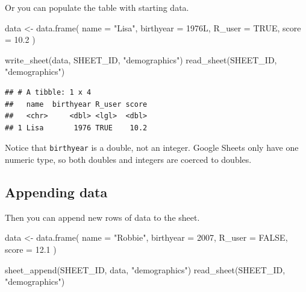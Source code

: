 \documentclass[
  oneside]{book}
\newenvironment{Shaded}{\begin{snugshade}}{\end{snugshade}}
\newcommand{\AttributeTok}[1]{\textcolor[rgb]{0.77,0.63,0.00}{#1}}
\newcommand{\ConstantTok}[1]{\textcolor[rgb]{0.00,0.00,0.00}{#1}}
\newcommand{\DecValTok}[1]{\textcolor[rgb]{0.00,0.00,0.81}{#1}}
\newcommand{\FloatTok}[1]{\textcolor[rgb]{0.00,0.00,0.81}{#1}}
\newcommand{\FunctionTok}[1]{\textcolor[rgb]{0.00,0.00,0.00}{#1}}
\newcommand{\NormalTok}[1]{#1}
\newcommand{\OtherTok}[1]{\textcolor[rgb]{0.56,0.35,0.01}{#1}}
\newcommand{\StringTok}[1]{\textcolor[rgb]{0.31,0.60,0.02}{#1}}
\begin{document}
Or you can populate the table with starting data.

\begin{Shaded}
\begin{Highlighting}[]
\NormalTok{data }\OtherTok{\textless{}{-}} \FunctionTok{data.frame}\NormalTok{(}
  \AttributeTok{name =} \StringTok{"Lisa"}\NormalTok{,}
  \AttributeTok{birthyear =}\NormalTok{ 1976L,}
  \AttributeTok{R\_user =} \ConstantTok{TRUE}\NormalTok{,}
  \AttributeTok{score =} \FloatTok{10.2}
\NormalTok{)}

\FunctionTok{write\_sheet}\NormalTok{(data, SHEET\_ID, }\StringTok{"demographics"}\NormalTok{)}
\FunctionTok{read\_sheet}\NormalTok{(SHEET\_ID, }\StringTok{"demographics"}\NormalTok{)}
\end{Highlighting}
\end{Shaded}

\begin{verbatim}
## # A tibble: 1 x 4
##   name  birthyear R_user score
##   <chr>     <dbl> <lgl>  <dbl>
## 1 Lisa       1976 TRUE    10.2
\end{verbatim}

\begin{info}
Notice that \texttt{birthyear} is a double, not an integer. Google Sheets only have one numeric type, so both doubles and integers are coerced to doubles.

\end{info}

\hypertarget{appending-data}{%
\subsection{Appending data}\label{appending-data}}

Then you can append new rows of data to the sheet.

\begin{Shaded}
\begin{Highlighting}[]
\NormalTok{data }\OtherTok{\textless{}{-}} \FunctionTok{data.frame}\NormalTok{(}
  \AttributeTok{name =} \StringTok{"Robbie"}\NormalTok{,}
  \AttributeTok{birthyear =} \DecValTok{2007}\NormalTok{,}
  \AttributeTok{R\_user =} \ConstantTok{FALSE}\NormalTok{,}
  \AttributeTok{score =} \FloatTok{12.1}
\NormalTok{)}

\FunctionTok{sheet\_append}\NormalTok{(SHEET\_ID, data, }\StringTok{"demographics"}\NormalTok{)}
\FunctionTok{read\_sheet}\NormalTok{(SHEET\_ID, }\StringTok{"demographics"}\NormalTok{)}
\end{Highlighting}
\end{Shaded}
\end{document}
